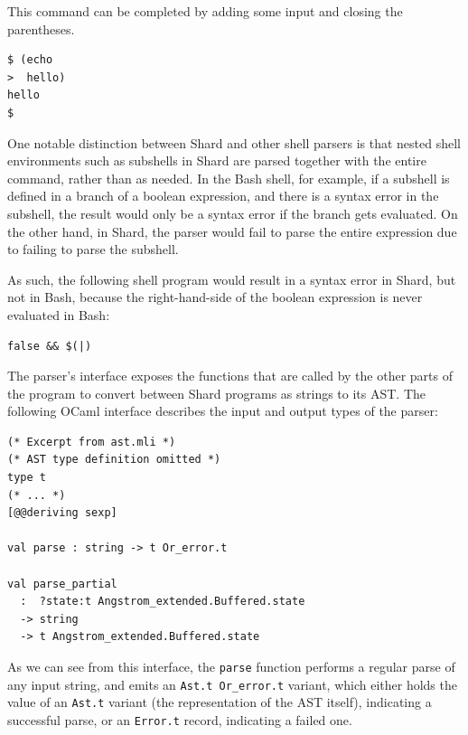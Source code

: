 \documentclass[oneside]{report}
\begin{document}
This command can be completed by adding some input and closing the parentheses.

\begin{minipage}[c]{\textwidth-15pt}
  \begin{lstlisting}[language=shard]
$ (echo
>  hello)
hello
$
\end{lstlisting}
  \smallskip
\end{minipage}

One notable distinction between Shard and other shell parsers is that nested shell environments such as subshells in Shard are parsed together with the entire command, rather than as needed.
In the Bash shell, for example, if a subshell is defined in a branch of a boolean expression, and there is a syntax error in the subshell, the result would only be a syntax error if the branch gets evaluated.
On the other hand, in Shard, the parser would fail to parse the entire expression due to failing to parse the subshell.

As such, the following shell program would result in a syntax error in Shard, but not in Bash, because the right-hand-side of the boolean expression is never evaluated in Bash:

\begin{minipage}[c]{\textwidth-15pt}
  \begin{lstlisting}[language=shard]
false && $(|)
\end{lstlisting}
  \smallskip
\end{minipage}

The parser's interface exposes the functions that are called by the other parts of the program to convert between Shard programs as strings to its AST. The following OCaml interface describes the input and output types of the parser:

\begin{minipage}[c]{\textwidth-15pt}
  \begin{lstlisting}
(* Excerpt from ast.mli *)
(* AST type definition omitted *)
type t
(* ... *)
[@@deriving sexp]

val parse : string -> t Or_error.t

val parse_partial
  :  ?state:t Angstrom_extended.Buffered.state
  -> string
  -> t Angstrom_extended.Buffered.state
\end{lstlisting}
  \smallskip
\end{minipage}

As we can see from this interface, the \texttt{parse} function performs a regular parse of any input string, and emits an \texttt{Ast.t Or\_error.t} variant, which either holds the value of an \texttt{Ast.t} variant (the representation of the AST itself), indicating a successful parse, or an \texttt{Error.t} record, indicating a failed one.
\end{document}
